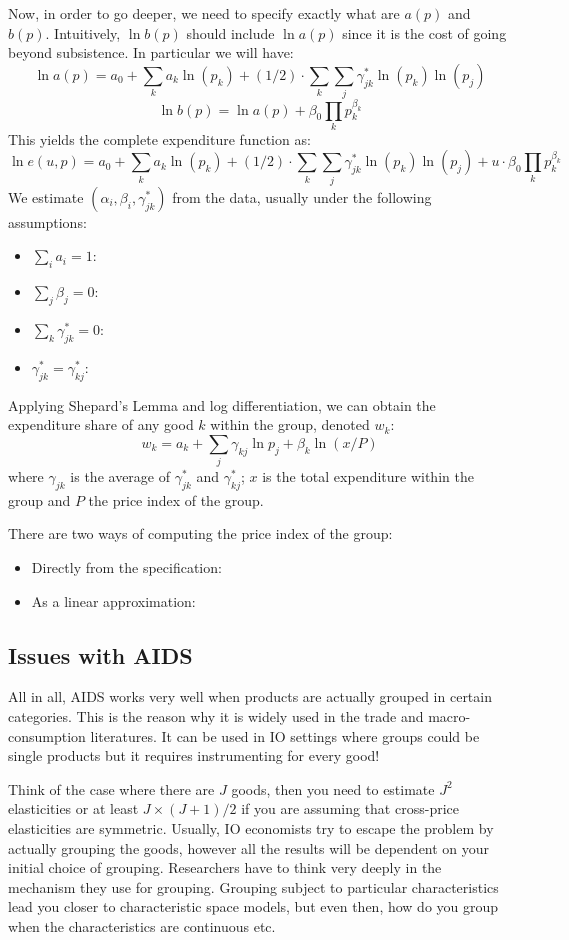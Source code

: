 \documentclass[12pt]{report}
\begin{document}
Now, in order to go deeper, we need to specify exactly what are $a(p)$ and $b(p)$. Intuitively, $\ln b(p)$ should include $\ln a(p)$ since it is the cost of going beyond subsistence. In particular we will have: $$\ln a(p) = a_0 + \sum_{k} a_k \ln (p_k) + (1/2)\cdot \sum_{k}\sum_{j} \gamma_{jk}^* \ln (p_k)\ln (p_j) $$ $$\ln b(p) = \ln a(p) + \beta_0 \prod_{k} p_k^{\beta_k} $$ This yields the complete expenditure function as: $$ \ln e(u, p) = a_0 + \sum_{k} a_k \ln (p_k) + (1/2)\cdot \sum_{k}\sum_{j} \gamma_{jk}^* \ln (p_k)\ln (p_j) + u\cdot \beta_0 \prod_{k} p_k^{\beta_k} $$
We estimate $(\alpha_i, \beta_i, \gamma_{jk}^*)$ from the data, usually under the following assumptions:\begin{itemize}
\item $\sum_i a_i = 1$:
\item $\sum_j \beta_j = 0$:
\item $\sum_k \gamma_{jk}^* = 0$:
\item $\gamma_{jk}^* = \gamma_{kj}^*$: 
\end{itemize}

Applying Shepard's Lemma and log differentiation, we can obtain the expenditure share of any good $k$ within the group, denoted $w_k$: $$w_k = a_k + \sum_j \gamma_{kj} \ln p_j + \beta_k \ln (x/P) $$ where $\gamma_{jk}$ is the average of $\gamma_{jk}^*$ and $\gamma_{kj}^*$; $x$ is the total expenditure within the group and $P$ the price index of the group.

There are two ways of computing the price index of the group:\begin{itemize}
\item Directly from the specification:
\item As a linear approximation:
\end{itemize}

\subsection{Issues with AIDS}

All in all, AIDS works very well when products are actually grouped in certain categories. This is the reason why it is widely used in the trade and macro-consumption literatures. It can be used in IO settings where groups could be single products but it requires instrumenting for every good!

Think of the case where there are $J$ goods, then you need to estimate $J^2$ elasticities or at least $J\times (J+1)/2$ if you are assuming that cross-price elasticities are symmetric. Usually, IO economists try to escape the problem by actually grouping the goods, however all the results will be dependent on your initial choice of grouping. Researchers have to think very deeply in the mechanism they use for grouping. Grouping subject to particular characteristics lead you closer to characteristic space models, but even then, how do you group when the characteristics are continuous etc.
\end{document}
